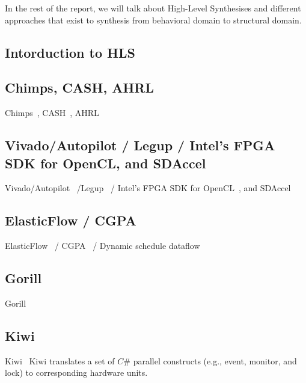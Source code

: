 In the rest of the report, we will talk about High-Level Synthesises and different approaches that exist to synthesis from behavioral domain to structural domain.

\subsection{Intorduction to HLS}
\cite{gajski_1994_introduction}

\subsection{Chimps, CASH, AHRL}

Chimps~\cite{chimps}, CASH~\cite{budiu_pegasus_2002,budiu_cash_2002}, AHRL~\cite{ahrl}
%

\subsection{Vivado/Autopilot / Legup / Intel's FPGA SDK for OpenCL, and SDAccel}

Vivado/Autopilot~\cite{vivado,vivadohls,autopilot} /Legup~\cite{canis_2011_legup} / Intel's FPGA SDK for OpenCL~\cite{opencl_sdk}, and SDAccel~\cite{sdaccel}
%

\subsection{ElasticFlow / CGPA}

ElasticFlow~\cite{elasticFlow} / CGPA~\cite{cgpa} / Dynamic schedule dataflow~\cite{josipovic_fpga_2018_dynamically}
%

\subsection{Gorill}
Gorill~\cite{lavasani_thesis}

\subsection{Kiwi}
Kiwi~\cite{kiwi}
Kiwi translates a set of $C\#$ parallel constructs (e.g., event, monitor,
and lock) to corresponding hardware units.

